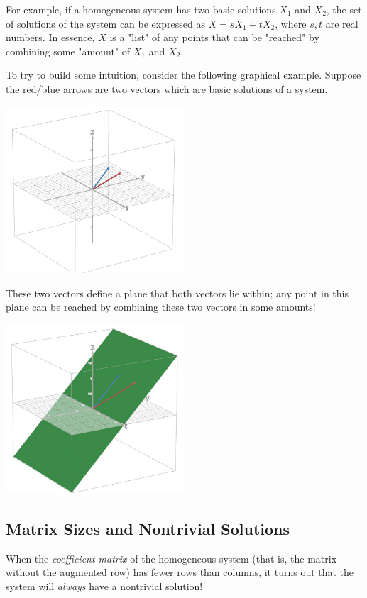 \documentclass[11pt]{exam}
\begin{document}
        For example, if a homogeneous system has two basic solutions $X_1$ and $X_2$, the set of solutions of the system can
        be expressed as $X = sX_1 + tX_2$, where $s,t$ are real numbers. In essence, $X$ is a "list" of any points that can be
        "reached" by combining some "amount" of $X_1$ and $X_2$.

        To try to build some intuition, consider the following graphical example.
        Suppose the red/blue arrows are two vectors which are basic solutions of a system.
        \begin{center}
            \includegraphics[width=0.5\textwidth]{vectors.JPG}
        \end{center}

        \pagebreak
        These two vectors define a plane that both vectors lie within; any point in this plane can be reached by combining these two vectors
        in some amounts!
        \begin{center}
            \includegraphics[width=0.5\textwidth]{plane.JPG}
        \end{center}
    
    \vspace{20px}
    \subsection{Matrix Sizes and Nontrivial Solutions}
        When the \textit{coefficient matrix} of the homogeneous system (that is, the matrix without the augmented row) has fewer rows
        than columns, it turns out that the system will \textit{always} have a nontrivial solution!
\end{document}

